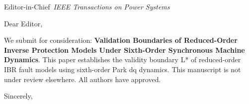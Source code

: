 \documentclass[11pt,a4paper]{letter}
\begin{document}
\begin{letter}{Editor-in-Chief\ \textit{IEEE Transactions on Power Systems}}
\opening{Dear Editor,}
We submit for consideration: \textbf{Validation Boundaries of Reduced-Order Inverse Protection Models Under Sixth-Order Synchronous Machine Dynamics}.
This paper establishes the validity boundary L* of reduced-order IBR fault models using sixth-order Park dq dynamics.
This manuscript is not under review elsewhere. All authors have approved.
\closing{Sincerely,}
\end{letter}
\end{document}
